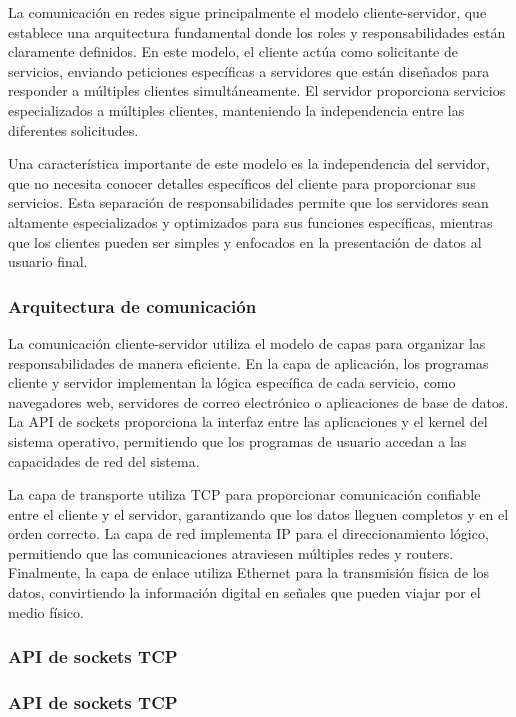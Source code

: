 \begin{itemize}
La comunicación en redes sigue principalmente el modelo cliente-servidor, que establece una arquitectura fundamental donde los roles y responsabilidades están claramente definidos. En este modelo, el cliente actúa como solicitante de servicios, enviando peticiones específicas a servidores que están diseñados para responder a múltiples clientes simultáneamente. El servidor proporciona servicios especializados a múltiples clientes, manteniendo la independencia entre las diferentes solicitudes.

Una característica importante de este modelo es la independencia del servidor, que no necesita conocer detalles específicos del cliente para proporcionar sus servicios. Esta separación de responsabilidades permite que los servidores sean altamente especializados y optimizados para sus funciones específicas, mientras que los clientes pueden ser simples y enfocados en la presentación de datos al usuario final.

\subsubsection{Arquitectura de comunicación}

La comunicación cliente-servidor utiliza el modelo de capas para organizar las responsabilidades de manera eficiente. En la capa de aplicación, los programas cliente y servidor implementan la lógica específica de cada servicio, como navegadores web, servidores de correo electrónico o aplicaciones de base de datos. La API de sockets proporciona la interfaz entre las aplicaciones y el kernel del sistema operativo, permitiendo que los programas de usuario accedan a las capacidades de red del sistema.

La capa de transporte utiliza TCP para proporcionar comunicación confiable entre el cliente y el servidor, garantizando que los datos lleguen completos y en el orden correcto. La capa de red implementa IP para el direccionamiento lógico, permitiendo que las comunicaciones atraviesen múltiples redes y routers. Finalmente, la capa de enlace utiliza Ethernet para la transmisión física de los datos, convirtiendo la información digital en señales que pueden viajar por el medio físico.

\subsubsection{API de sockets TCP}

\subsubsection{API de sockets TCP}


\end{itemize}
